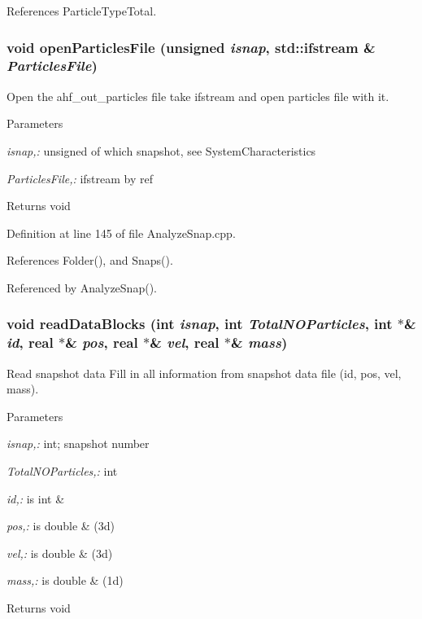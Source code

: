 References ParticleTypeTotal.

\subsubsection[{openParticlesFile}]{\setlength{\rightskip}{0pt plus 5cm}void openParticlesFile (unsigned {\em isnap}, \/  std::ifstream \& {\em ParticlesFile})}\label{AnalyzeSnap_8cpp_a07f732b0c1b2b63a40dd8ae52850f50b}


Open the ahf\_\-out\_\-particles file take ifstream and open particles file with it. 


\begin{DoxyParams}{Parameters}
\item[{\em isnap,:}]unsigned of which snapshot, see SystemCharacteristics \item[{\em ParticlesFile,:}]ifstream by ref \end{DoxyParams}
\begin{DoxyReturn}{Returns}
void 
\end{DoxyReturn}


Definition at line 145 of file AnalyzeSnap.cpp.



References Folder(), and Snaps().



Referenced by AnalyzeSnap().

\subsubsection[{readDataBlocks}]{\setlength{\rightskip}{0pt plus 5cm}void readDataBlocks (int {\em isnap}, \/  int {\em TotalNOParticles}, \/  int $\ast$\& {\em id}, \/  {\bf real} $\ast$\& {\em pos}, \/  {\bf real} $\ast$\& {\em vel}, \/  {\bf real} $\ast$\& {\em mass})}\label{AnalyzeSnap_8cpp_a5e23ce523297aeb1c2f118568cefb975}


Read snapshot data Fill in all information from snapshot data file (id, pos, vel, mass). 


\begin{DoxyParams}{Parameters}
\item[{\em isnap,:}]int; snapshot number \item[{\em TotalNOParticles,:}]int \item[{\em id,:}]is int \& \item[{\em pos,:}]is double \& (3d) \item[{\em vel,:}]is double \& (3d) \item[{\em mass,:}]is double \& (1d) \end{DoxyParams}
\begin{DoxyReturn}{Returns}
void 
\end{DoxyReturn}


